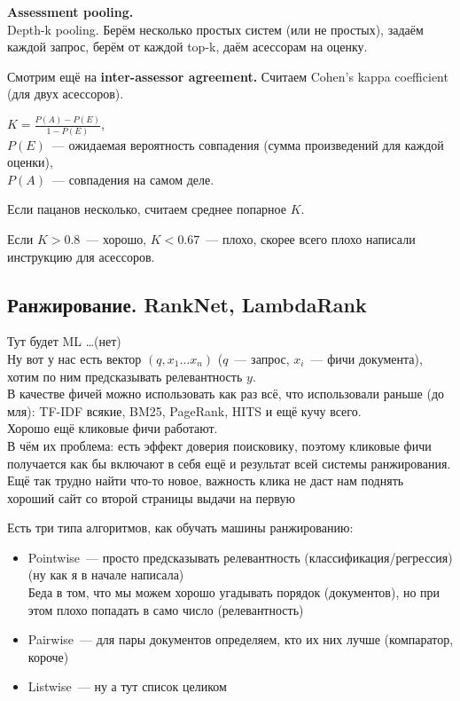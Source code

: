 \documentclass[12pt]{article}
\begin{document}
      \smallskip\smallskip
      {\bf Assessment pooling.}\\
       Depth-k pooling. Берём несколько простых систем (или не простых), задаём каждой запрос, берём от каждой top-k, даём асессорам на оценку.

      Смотрим ещё на {\bf inter-assessor agreement.} Считаем Cohen's kappa coefficient (для двух асессоров).

      $K = \frac{P(A) - P(E)}{1 - P(E)}$,\\
      $P(E)$~--- ожидаемая вероятность совпадения (сумма произведений для каждой оценки),\\
      $P(A)$~--- совпадения на самом деле.

      Если пацанов несколько, считаем среднее попарное $K$.

      Если $K > 0.8$~--- хорошо, $K < 0.67$~--- плохо, скорее всего плохо написали инструкцию для асессоров.
      \pagebreak

  \subsection{Ранжирование. RankNet, LambdaRank}
      Тут будет ML \dots (нет)\\
      Ну вот у нас есть вектор $(q, x_1 \dots x_n)$ ($q$~--- запрос, $x_i$~--- фичи документа), хотим по ним предсказывать релевантность $y$.\\
      В качестве фичей можно использовать как раз всё, что использовали раньше (до мля): TF-IDF всякие, BM25, PageRank, HITS и ещё кучу всего.\\
      Хорошо ещё кликовые фичи работают.\\
      В чём их проблема: есть эффект доверия поисковику, поэтому кликовые фичи получается как бы включают в себя ещё и результат всей системы ранжирования. Ещё так трудно найти что-то новое, важность клика не даст нам поднять хороший сайт со второй страницы выдачи на первую

      \smallskip\smallskip
      Есть три типа алгоритмов, как обучать машины ранжированию:
        \begin{itemize}
            \item Pointwise~--- просто предсказывать релевантность (классификация/регрессия) (ну как я в начале написала)\\
            Беда в том, что мы можем хорошо угадывать порядок (документов), но при этом плохо попадать в само число (релевантность)
            \item Pairwise~--- для пары документов определяем, кто их них лучше (компаратор, короче)
            \item Listwise~--- ну а тут список целиком
        \end{itemize}
\end{document}
